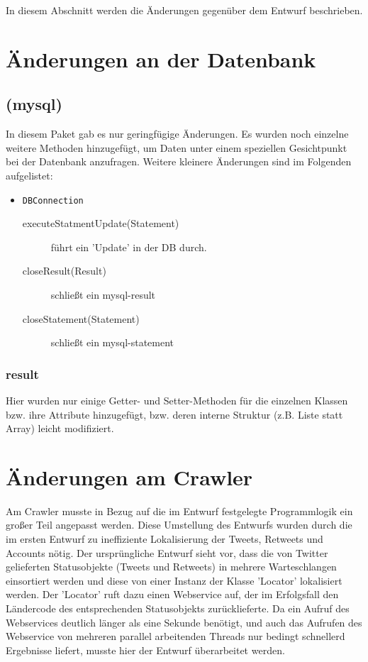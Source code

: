 In diesem Abschnitt werden die Änderungen gegenüber dem Entwurf beschrieben.

\section{Änderungen an der Datenbank}

\subsection{(mysql)}
In diesem Paket gab es nur geringfügige Änderungen. Es wurden noch einzelne weitere Methoden hinzugefügt, um Daten unter einem speziellen Gesichtpunkt bei der Datenbank anzufragen. Weitere kleinere Änderungen sind im Folgenden aufgelistet:
\begin{itemize}
	\item \lstinline{DBConnection}
	\begin{description}
		\item[executeStatmentUpdate(Statement)] führt ein 'Update' in der DB durch.
		\item[closeResult(Result)] schließt ein mysql-result
		\item[closeStatement(Statement)] schließt ein mysql-statement
	\end{description}
\end{itemize}
	
\subsubsection{result}
Hier wurden nur einige Getter- und Setter-Methoden für die einzelnen Klassen bzw. ihre Attribute hinzugefügt, bzw. deren interne Struktur (z.B. Liste statt Array) leicht modifiziert.

\section{Änderungen am Crawler}
Am Crawler musste in Bezug auf die im Entwurf festgelegte Programmlogik ein großer Teil angepasst werden. Diese Umstellung des Entwurfs wurden durch die im ersten Entwurf zu ineffiziente Lokalisierung der Tweets, Retweets und Accounts nötig. Der ursprüngliche Entwurf sieht vor, dass die von Twitter gelieferten Statusobjekte (Tweets und Retweets) in mehrere Warteschlangen einsortiert werden und diese von einer Instanz der Klasse 'Locator' lokalisiert werden. Der 'Locator' ruft dazu einen Webservice auf, der im Erfolgsfall den Ländercode des entsprechenden Statusobjekts zurücklieferte. Da ein Aufruf des Webservices deutlich länger als eine Sekunde benötigt, und auch das Aufrufen des Webservice von mehreren parallel arbeitenden Threads nur bedingt schnellerd Ergebnisse liefert, musste hier der Entwurf überarbeitet werden.

